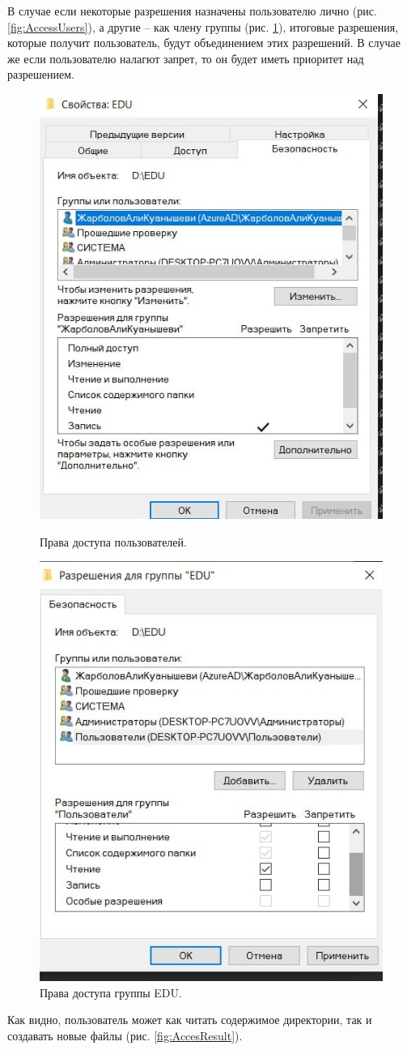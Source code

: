 В случае если некоторые разрешения назначены пользователю лично (рис. \ref{fig:AccessUsers}), а другие –
как члену группы (рис. \ref{fig:AccessEdu}), итоговые разрешения, которые получит пользователь, будут объединением этих разрешений. В случае же если пользователю налагют запрет, то он будет иметь приоритет над разрешением.

\begin{figure}[h!]
    \centering
    \begin{minipage}[p]{0.45\linewidth}
    \centering
    \includegraphics[width=0.5\linewidth]{Pic/lab2/photo_2025-05-21_21-18-32.jpg}
    \caption{Права доступа пользователей.}
    \label{fig:AccessUsers}
    \end{minipage}
    \hfill
    \begin{minipage}[p]{0.45\linewidth}
    \centering
    \includegraphics[width=0.5\linewidth]{Pic/lab2/photo_2025-05-21_21-18-38.jpg}
    \caption{Права доступа группы EDU.}
    \label{fig:AccessEdu}
    \end{minipage}
\end{figure}
\newpage
Как видно, пользователь может как читать содержимое директории, так и создавать новые файлы (рис. \ref{fig:AccesResult}).


